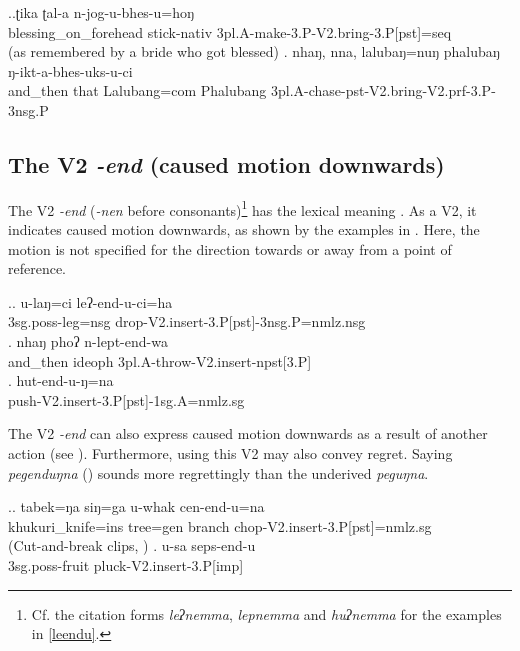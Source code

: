 \ex.\ag.ʈika ʈal-a n-jog-u-bhes-u=hoŋ\\
blessing\_on\_forehead stick{\sc -nativ} {\sc 3pl.A-}make{\sc -3.P-V2.bring-3.P[pst]=seq}\\
 (as remembered by a bride who got blessed) 
\bg. nhaŋ,    nna,  lalubaŋ=nuŋ phalubaŋ ŋ-ikt-a-bhes-uks-u-ci\\
and\_then that Lalubang{\sc =com}  Phalubang {\sc 3pl.A-}chase{\sc -pst-V2.bring-V2.prf-3.P-3nsg.P}\\
  


\subsection{The V2 \emph{-end}  (caused motion downwards)} \label{V2-insert}%

The V2 \emph{-end} (\ti \emph{-nen} before consonants)\footnote{Cf. the citation forms \emph{leʔnemma}, \emph{lepnemma} and \emph{huʔnemma} for the examples in \ref{leendu}.} has the lexical meaning . As a V2, it indicates caused motion downwards, as shown by the examples in \Next. Here, the motion is not specified for the direction towards or away from a point of reference.
 
\ex.\label{leendu}\ag. u-laŋ=ci leʔ-end-u-ci=ha\\
 {\sc 3sg.poss-}leg{\sc =nsg} drop{\sc -V2.insert-3.P[pst]-3nsg.P=nmlz.nsg}\\
\bg. nhaŋ    phoʔ   n-lept-end-wa\\
	and\_then {\sc ideoph}	{\sc 3pl.A-}throw{\sc -V2.insert-npst[3.P]}\\
	 
	\bg. hut-end-u-ŋ=na\\
	push{\sc -V2.insert-3.P[pst]-1sg.A=nmlz.sg}\\


The V2 \emph{-end} can also express caused motion downwards as a result of another action (see \Next). Furthermore, using this V2 may also convey regret. Saying \emph{pegenduŋna} () sounds more regrettingly than the underived  \emph{peguŋna}.

\ex.\ag. tabek=ŋa siŋ=ga u-whak cen-end-u=na\\
khukuri\_knife{\sc =ins} tree{\sc =gen} branch chop{\sc -V2.insert-3.P[pst]=nmlz.sg}\\
  (Cut-and-break clips, \citealt{Bohnemeyeretal2010_cut})
\bg. u-sa seps-end-u\\
{\sc 3sg.poss-}fruit pluck{\sc -V2.insert-3.P[imp]}\\


